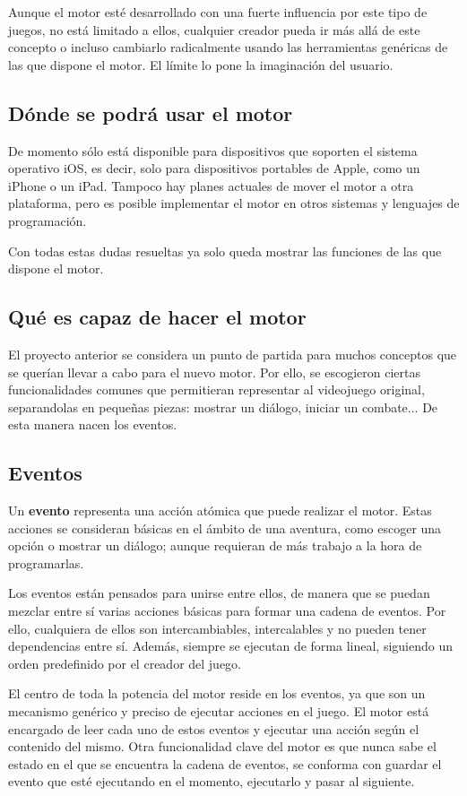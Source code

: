 Aunque el motor esté desarrollado con una fuerte influencia por este tipo de juegos, no está limitado a ellos, cualquier creador pueda ir más allá de este concepto o incluso cambiarlo radicalmente usando las herramientas genéricas de las que dispone el motor. El límite lo pone la imaginación del usuario.

\subsection{Dónde se podrá usar el motor}
De momento sólo está disponible para dispositivos que soporten el sistema operativo iOS, es decir, solo para dispositivos portables de Apple, como un iPhone o un iPad.
Tampoco hay planes actuales de mover el motor a otra plataforma, pero es posible implementar el motor en otros sistemas y lenguajes de programación.

Con todas estas dudas resueltas ya solo queda mostrar las funciones de las que dispone el motor.

\subsection{Qué es capaz de hacer el motor}

El proyecto anterior se considera un punto de partida para muchos conceptos que se querían llevar a cabo para el nuevo motor. Por ello, se escogieron ciertas funcionalidades comunes que permitieran representar al videojuego original, separandolas en pequeñas piezas: mostrar un diálogo, iniciar un combate...
De esta manera nacen los eventos.

\subsection{Eventos}

Un \textbf{evento} representa una acción atómica que puede realizar el motor. Estas acciones se consideran básicas en el ámbito de una aventura, como escoger una opción o mostrar un diálogo; aunque requieran de más trabajo a la hora de programarlas.

Los eventos están pensados para unirse entre ellos, de manera que se puedan mezclar entre sí varias acciones básicas para formar una cadena de eventos. Por ello, cualquiera de ellos son intercambiables, intercalables y no pueden tener dependencias entre sí.
Además, siempre se ejecutan de forma lineal, siguiendo un orden predefinido por el creador del juego.

El centro de toda la potencia del motor reside en los eventos, ya que son un mecanismo genérico y preciso de ejecutar acciones en el juego. El motor está encargado de leer cada uno de estos eventos y ejecutar una acción según el contenido del mismo.
Otra funcionalidad clave del motor es que nunca sabe el estado en el que se encuentra la cadena de eventos, se conforma con guardar el evento que esté ejecutando en el momento, ejecutarlo y pasar al siguiente.

